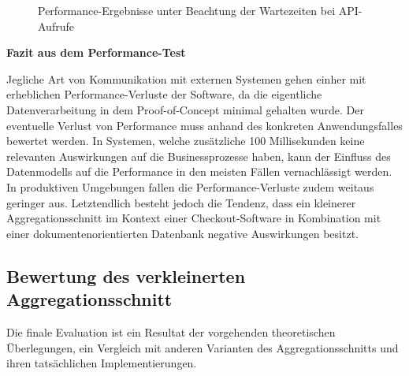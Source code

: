 \begin{figure}
	\centering
	\footnotesize
	
	\caption{Performance-Ergebnisse unter Beachtung der Wartezeiten bei API-Aufrufe}
	\label{fig:PerformanceDelay}
\end{figure}

\textbf{Fazit aus dem Performance-Test}

Jegliche Art von Kommunikation mit externen Systemen gehen einher mit erheblichen Performance-Verluste der Software, da die eigentliche Datenverarbeitung in dem Proof-of-Concept minimal gehalten wurde. Der eventuelle Verlust von Performance muss anhand des konkreten Anwendungsfalles bewertet werden. In Systemen, welche zusätzliche 100 Millisekunden keine relevanten Auswirkungen auf die Businessprozesse haben, kann der Einfluss des Datenmodells auf die Performance in den meisten Fällen vernachlässigt werden. In produktiven Umgebungen fallen die Performance-Verluste zudem weitaus geringer aus. Letztendlich besteht jedoch die Tendenz, dass ein kleinerer Aggregationsschnitt im Kontext einer Checkout-Software in Kombination mit einer dokumentenorientierten Datenbank negative Auswirkungen besitzt.

\subsection{Bewertung des verkleinerten Aggregationsschnitt}

Die finale Evaluation ist ein Resultat der vorgehenden theoretischen Überlegungen, ein Vergleich mit anderen Varianten des Aggregationsschnitts und ihren tatsächlichen Implementierungen.

